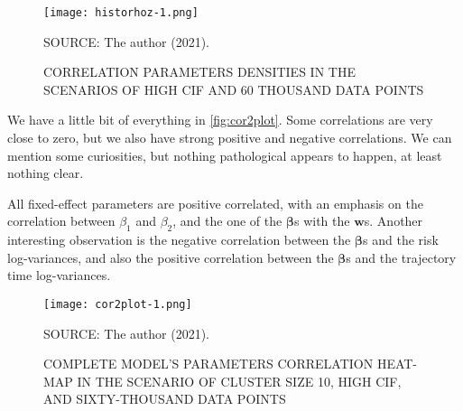 \begin{figure}[H]
 \setlength{\abovecaptionskip}{.0001pt}
 \caption{CORRELATION PARAMETERS DENSITIES IN THE SCENARIOS OF HIGH CIF
          AND 60 THOUSAND DATA POINTS}
 \vspace{0.2cm}\centering
 \texttt{[image: historhoz-1.png]}\\
 \begin{footnotesize}
  SOURCE: The author (2021).
 \end{footnotesize}
 \label{fig:historhoz}
\end{figure}

We have a little bit of everything in \autoref{fig:cor2plot}. Some
correlations are very close to zero, but we also have strong positive
and negative correlations. We can mention some curiosities, but nothing
pathological appears to happen, at least nothing clear.

All fixed-effect parameters are positive correlated, with an emphasis on
the correlation between \(\beta_{1}\) and \(\beta_{2}\), and the one of
the \(\bm{\beta}\)s with the \(\bm{w}\)s. Another interesting
observation is the negative correlation between the \(\bm{\beta}\)s and
the risk log-variances, and also the positive correlation between the
\(\bm{\beta}\)s and the trajectory time log-variances.

\begin{figure}[!htpb]
 \setlength{\abovecaptionskip}{.0001pt}
 \caption{COMPLETE MODEL'S PARAMETERS CORRELATION HEAT-MAP IN THE
          SCENARIO OF CLUSTER SIZE 10, HIGH CIF, AND SIXTY-THOUSAND DATA
          POINTS}
 \centering
 \texttt{[image: cor2plot-1.png]}\\
 \vspace{-0.2cm}
 \begin{footnotesize}
  SOURCE: The author (2021).
 \end{footnotesize}
 \label{fig:cor2plot}
\end{figure}


